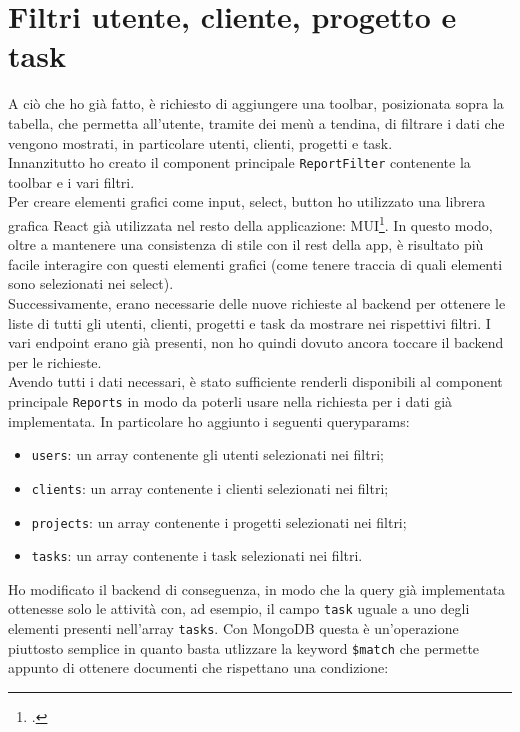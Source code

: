 \section{Filtri utente, cliente, progetto e task}
\noindent A ciò che ho già fatto, è richiesto di aggiungere una toolbar, posizionata sopra la tabella, che permetta all'utente, tramite dei menù a tendina, di filtrare i dati che vengono mostrati, in particolare utenti, clienti, progetti e task. \\
Innanzitutto ho creato il component principale \texttt{ReportFilter} contenente la toolbar e i vari filtri. \\
Per creare elementi grafici come input, select, button ho utilizzato una librera grafica React già utilizzata nel resto della applicazione: MUI\footcite{site:mui}. In questo modo, oltre a mantenere una consistenza di stile con il rest della app, è risultato più facile interagire con questi elementi grafici (come tenere traccia di quali elementi sono selezionati nei select).\\
Successivamente, erano necessarie delle nuove richieste al backend per ottenere le liste di tutti gli utenti, clienti, progetti e task da mostrare nei rispettivi filtri. I vari endpoint erano già presenti, non ho quindi dovuto ancora toccare il backend per le richieste.\\
Avendo tutti i dati necessari, è stato sufficiente renderli disponibili al component principale \texttt{Reports} in modo da poterli usare nella richiesta per i dati già implementata. In particolare ho aggiunto i seguenti queryparams:
\begin{itemize}
  \item \texttt{users}: un array contenente gli utenti selezionati nei filtri;
  \item \texttt{clients}: un array contenente i clienti selezionati nei filtri;
  \item \texttt{projects}: un array contenente i progetti selezionati nei filtri;
  \item \texttt{tasks}: un array contenente i task selezionati nei filtri.
\end{itemize}
Ho modificato il backend di conseguenza, in modo che la query già implementata ottenesse solo le attività con, ad esempio, il campo \texttt{task} uguale a uno degli elementi presenti nell'array \texttt{tasks}. Con MongoDB questa è un'operazione piuttosto semplice in quanto basta utlizzare la keyword \texttt{\$match} che permette appunto di ottenere documenti che rispettano una condizione:

